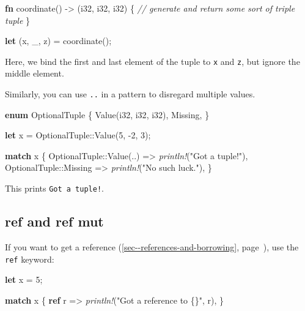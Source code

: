 \documentclass[a4paper,]{book}
\renewcommand*{\hyperref}[2][\ar]{%
  \def\ar{#2}%
  #2 (\autoref{#1}, page~\pageref{#1})}
\newenvironment{Shaded}{\begin{snugshade}}{\end{snugshade}}
\newcommand{\KeywordTok}[1]{\textcolor[rgb]{0.13,0.29,0.53}{\textbf{{#1}}}}
\newcommand{\DataTypeTok}[1]{\textcolor[rgb]{0.13,0.29,0.53}{{#1}}}
\newcommand{\DecValTok}[1]{\textcolor[rgb]{0.00,0.00,0.81}{{#1}}}
\newcommand{\StringTok}[1]{\textcolor[rgb]{0.31,0.60,0.02}{{#1}}}
\newcommand{\CommentTok}[1]{\textcolor[rgb]{0.56,0.35,0.01}{\textit{{#1}}}}
\newcommand{\PreprocessorTok}[1]{\textcolor[rgb]{0.56,0.35,0.01}{\textit{{#1}}}}
\newcommand{\NormalTok}[1]{{#1}}
\begin{document}
\begin{Shaded}
\begin{Highlighting}[]
\KeywordTok{fn} \NormalTok{coordinate() -> (}\DataTypeTok{i32}\NormalTok{, }\DataTypeTok{i32}\NormalTok{, }\DataTypeTok{i32}\NormalTok{) \{}
    \CommentTok{// generate and return some sort of triple tuple}
\NormalTok{\}}

\KeywordTok{let} \NormalTok{(x, _, z) = coordinate();}
\end{Highlighting}
\end{Shaded}

Here, we bind the first and last element of the tuple to \texttt{x} and
\texttt{z}, but ignore the middle element.

Similarly, you can use \texttt{..} in a pattern to disregard multiple
values.

\begin{Shaded}
\begin{Highlighting}[]
\KeywordTok{enum} \NormalTok{OptionalTuple \{}
    \NormalTok{Value(}\DataTypeTok{i32}\NormalTok{, }\DataTypeTok{i32}\NormalTok{, }\DataTypeTok{i32}\NormalTok{),}
    \NormalTok{Missing,}
\NormalTok{\}}

\KeywordTok{let} \NormalTok{x = OptionalTuple::Value(}\DecValTok{5}\NormalTok{, -}\DecValTok{2}\NormalTok{, }\DecValTok{3}\NormalTok{);}

\KeywordTok{match} \NormalTok{x \{}
    \NormalTok{OptionalTuple::Value(..) => }\PreprocessorTok{println!}\NormalTok{(}\StringTok{"Got a tuple!"}\NormalTok{),}
    \NormalTok{OptionalTuple::Missing => }\PreprocessorTok{println!}\NormalTok{(}\StringTok{"No such luck."}\NormalTok{),}
\NormalTok{\}}
\end{Highlighting}
\end{Shaded}

This prints \texttt{Got\ a\ tuple!}.

\subsection{ref and ref mut}\label{ref-and-ref-mut}

If you want to get a
\hyperref[sec--references-and-borrowing]{reference}, use the
\texttt{ref} keyword:

\begin{Shaded}
\begin{Highlighting}[]
\KeywordTok{let} \NormalTok{x = }\DecValTok{5}\NormalTok{;}

\KeywordTok{match} \NormalTok{x \{}
    \KeywordTok{ref} \NormalTok{r => }\PreprocessorTok{println!}\NormalTok{(}\StringTok{"Got a reference to \{\}"}\NormalTok{, r),}
\NormalTok{\}}
\end{Highlighting}
\end{Shaded}
\end{document}
